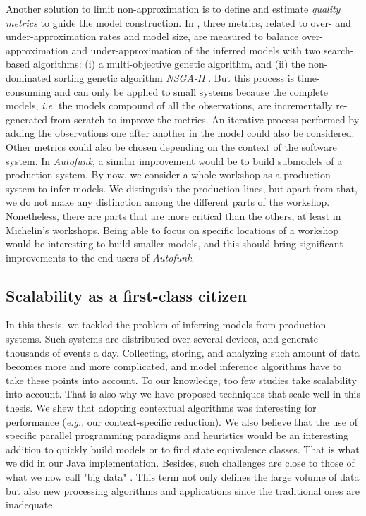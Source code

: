 Another solution to limit non-approximation is to define and
estimate \emph{quality metrics}
\cite{tonella2012finding,Lo20122063} to guide the model
construction. In \cite{tonella2012finding}, three metrics,
related to over- and under-approximation rates and model size,
are measured to balance over-approximation and
under-approximation of the inferred models with two search-based
algorithms: (i) a multi-objective genetic algorithm, and (ii) the
non-dominated sorting genetic algorithm \textit{NSGA-II}
\cite{deb2002fast}. But this process is time-consuming and can
only be applied to small systems because the complete models,
\emph{i.e.} the models compound of all the observations, are
incrementally re-generated from scratch to improve the metrics.
An iterative process performed by adding the observations one
after another in the model could also be considered. Other
metrics could also be chosen depending on the context of the
software system. In \textit{Autofunk}, a similar improvement
would be to build submodels of a production system. By now, we
consider a whole workshop as a production system to infer models.
We distinguish the production lines, but apart from that, we do
not make any distinction among the different parts of the
workshop.  Nonetheless, there are parts that are more critical
than the others, at least in Michelin's workshops. Being able to
focus on specific locations of a workshop would be interesting to
build smaller models, and this should bring significant
improvements to the end users of \textit{Autofunk}.

\subsection{Scalability as a first-class citizen}

In this thesis, we tackled the problem of inferring models from
production systems. Such systems are distributed over several
devices, and generate thousands of events a day. Collecting,
storing, and analyzing such amount of data becomes more and more
complicated, and model inference algorithms have to take these
points into account. To our knowledge, too few studies
\cite{Yang:2006:PMT:1134285.1134325,Pradel:2009} take scalability
into account. That is also why we have proposed techniques that
scale well in this thesis. We shew that adopting contextual
algorithms was interesting for performance (\emph{e.g.}, our
context-specific reduction).  We also believe that the use of
specific parallel programming paradigms and heuristics would be
an interesting addition to quickly build models or to find state
equivalence classes. That is what we did in our Java
implementation. Besides, such challenges are close to those of
what we now call "big data" \cite{bigdata14}. This term not only
defines the large volume of data but also new processing
algorithms and applications since the traditional ones are
inadequate.


